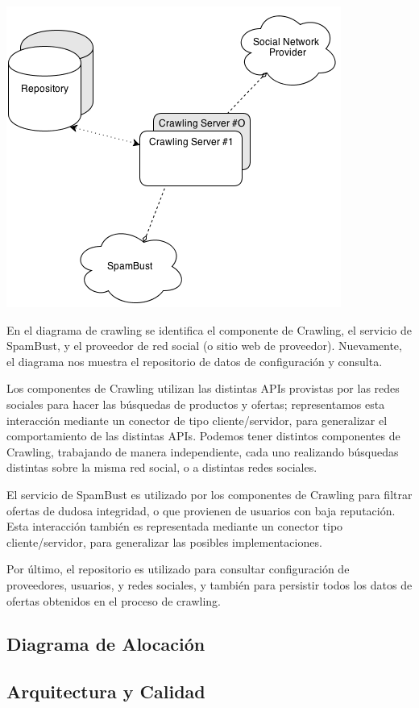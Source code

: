 \includegraphics[scale=0.5]{ISW2_cNc_Crawling}

En el diagrama de crawling se identifica el componente de Crawling, el servicio de SpamBust, y el proveedor de red social (o sitio web de proveedor). Nuevamente, el diagrama nos muestra el repositorio de datos de configuraci\'on y consulta.

Los componentes de Crawling utilizan las distintas APIs provistas por las redes sociales para hacer las b\'usquedas de productos y ofertas; representamos esta interacci\'on mediante un conector de tipo cliente/servidor, para generalizar el comportamiento de las distintas APIs. Podemos tener distintos componentes de Crawling, trabajando de manera independiente, cada uno realizando b\'usquedas distintas sobre la misma red social, o a distintas redes sociales.

El servicio de SpamBust es utilizado por los componentes de Crawling para filtrar ofertas de dudosa integridad, o que provienen de usuarios con baja reputaci\'on. Esta interacci\'on tambi\'en es representada mediante un conector tipo cliente/servidor, para generalizar las posibles implementaciones.

Por \'ultimo, el repositorio es utilizado para consultar configuraci\'on de proveedores, usuarios, y redes sociales, y tambi\'en para persistir todos los datos de ofertas obtenidos en el proceso de crawling.


\subsection*{Diagrama de Alocaci\'on}


\subsection*{Arquitectura y Calidad}

